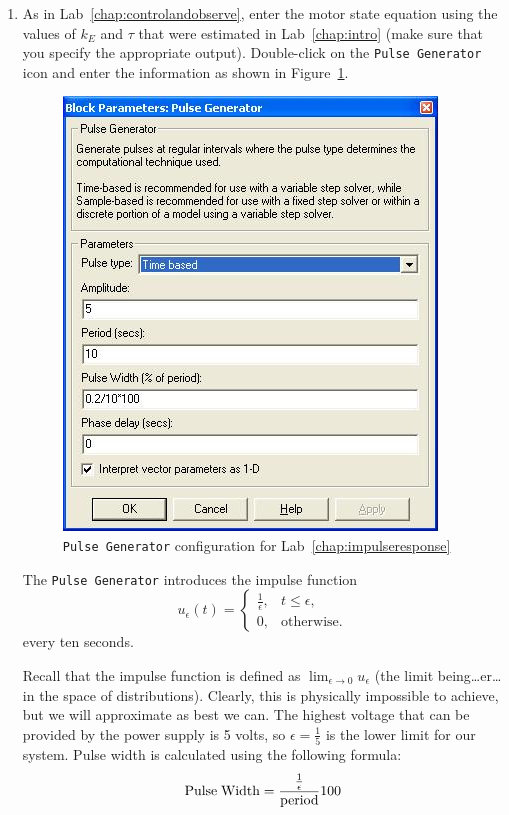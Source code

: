 \begin{enumerate}
\item As in Lab~\ref{chap:controlandobserve}\@, enter the motor state
equation using the values of $k_{E}$ and $\tau$ that were estimated in
Lab~\ref{chap:intro} (make sure that you specify the appropriate output).
Double-click on the \verb|Pulse Generator| icon and enter the information as
shown in Figure~\ref{fig:pulseConfig}\@.
\begin{figure}[htbp]
\centering
\includegraphics[width=0.6\hsize]{pix/impulseResponsePulseConfig.jpg}
\caption{\texttt{Pulse Generator} configuration for
Lab~\ref{chap:impulseresponse}}\label{fig:pulseConfig}
\end{figure}%
The \verb|Pulse Generator| introduces the impulse function
\begin{equation*}
u_{\epsilon}(t)=\begin{cases}\frac{1}{\epsilon},&
t\leq\epsilon,\\0,&\textrm{otherwise}.\end{cases}
\end{equation*}
every ten seconds.

Recall that the impulse function is defined as
$\lim_{\epsilon\rightarrow0}{u_{\epsilon}}$ (the limit being\ldots er\ldots
in the space of distributions).  Clearly, this is physically impossible to
achieve, but we will approximate as best we can.  The highest voltage that
can be provided by the power supply is 5 volts, so $\epsilon = \frac{1}{5}$
is the lower limit for our system. Pulse width is calculated using the
following formula:
\begin{equation*}
\textrm{Pulse\;Width} = \frac{\frac{1}{\epsilon}}{\textrm{period}}100
\end{equation*}


\end{enumerate}
